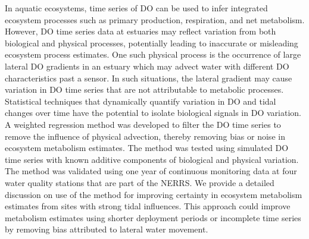 In aquatic ecosystems, time series of \ac{DO} can be used to infer integrated ecosystem processes such as primary production, respiration, and net metabolism.  However, \ac{DO} time series data at estuaries may reflect variation from both biological and physical processes, potentially leading to inaccurate or misleading ecosystem process estimates.  One such physical process is the occurrence of large lateral \ac{DO} gradients in an estuary which may advect water with different \ac{DO} characteristics past a sensor.  In such situations, the lateral gradient may cause variation in \ac{DO} time series that are not attributable to metabolic processes.  Statistical techniques that dynamically quantify variation in \ac{DO} and tidal changes over time have the potential to isolate biological signals in \ac{DO} variation.  A weighted regression method was developed to filter the \ac{DO} time series to remove the influence of physical advection, thereby removing bias or noise in ecosystem metabolism estimates.  The method was tested using simulated \ac{DO} time series with known additive components of biological and physical variation.  The method was validated using one year of continuous monitoring data at four water quality stations that are part of the \acl{NERRS}. We provide a detailed discussion on use of the method for improving certainty in ecosystem metabolism estimates from sites with strong tidal influences.  This approach could improve metabolism estimates using shorter deployment periods or incomplete time series by removing bias attributed to lateral water movement. 